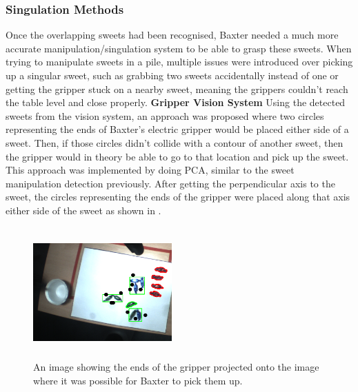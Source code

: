 \subsubsection{Singulation Methods}
Once the overlapping sweets had been recognised, Baxter needed a much more accurate manipulation/singulation system to be able to grasp these sweets. When trying to manipulate sweets in a pile, multiple issues were introduced over picking up a singular sweet, such as grabbing two sweets accidentally instead of one or getting the gripper stuck on a nearby sweet, meaning the grippers couldn't reach the table level and close properly.
\newline\newline
\textbf{Gripper Vision System}\newline
Using the detected sweets from the vision system, an approach was proposed where two circles representing the ends of Baxter's electric gripper would be placed either side of a sweet. Then, if those circles didn't collide with a contour of another sweet, then the gripper would in theory be able to go to that location and pick up the sweet. This approach was implemented by doing PCA, similar to the sweet manipulation detection previously. After getting the perpendicular axis to the sweet, the circles representing the ends of the gripper were placed along that axis either side of the sweet as shown in \textbf{}.
\captionsetup[figure]{justification=centering}
\begin{figure}[ht!]
        \centering 
        \includegraphics[width=0.475\textwidth, height=5cm]{circlegripperimage.png}
        \caption{An image showing the ends of the gripper projected onto the image where it was possible for Baxter to pick them up.}
         \label{fig:fakeGripper}
\end{figure}
\newline\newline
